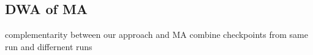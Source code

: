 \subsection{DWA of MA}

complementarity between our approach and MA
combine checkpoints from same run and differnent runs



